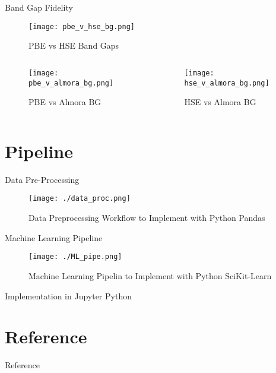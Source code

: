 \documentclass[10pt, compress]{beamer}
\begin{document}
\begin{frame}[allowframebreaks]{Band Gap Fidelity}
\begin{figure}[htbp]
\centering
\texttt{[image: pbe\_v\_hse\_bg.png]}
\caption{PBE vs HSE Band Gaps}
\end{figure}
\cite{almora-2020-devic-perfor}
\begin{columns}
\begin{column}{0.4\columnwidth}
\begin{figure}[htbp]
\centering
\texttt{[image: pbe\_v\_almora\_bg.png]}
\caption{PBE vs Almora BG}
\end{figure}
\end{column}
\begin{column}{0.6\columnwidth}
\begin{figure}[htbp]
\centering
\texttt{[image: hse\_v\_almora\_bg.png]}
\caption{HSE vs Almora BG}
\end{figure}
\end{column}
\end{columns}
\end{frame}
\section{Pipeline}
\label{sec:org78ce262}
\begin{frame}[label={sec:orgb9045fa}]{Data Pre-Processing}
\begin{figure}[htbp]
\centering
\texttt{[image: ./data\_proc.png]}
\caption{Data Preprocessing Workflow to Implement with Python Pandas}
\end{figure}
\end{frame}

\begin{frame}[label={sec:org8584cb5}]{Machine Learning Pipeline}
\begin{figure}[htbp]
\centering
\texttt{[image: ./ML\_pipe.png]}
\caption{Machine Learning Pipelin to Implement with Python SciKit-Learn}
\end{figure}
\end{frame}

\begin{frame}[allowframebreaks]{Implementation in Jupyter Python}
\small

\end{frame}
\section{Reference}
\label{sec:org0bbdce4}
\begin{frame}[allowframebreaks]{Reference}


\end{frame}
\end{document}
